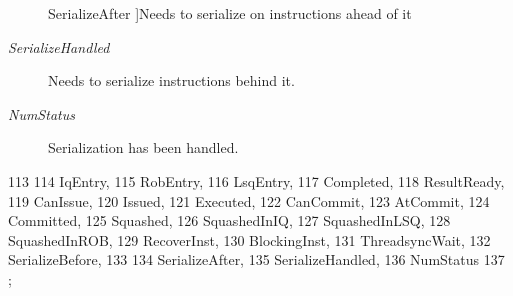 \begin{Desc}
\begin{description}
{{SerializeAfter}
\label{classBaseDynInst_a67a0db04d321a74b7e7fcfd3f1a3f70bab11834485756e0e9b84886d7d014a08f}
}]Needs to serialize on instructions ahead of it \item[{\em 
\hypertarget{classBaseDynInst_a67a0db04d321a74b7e7fcfd3f1a3f70ba5dcfe61e192f9f6a72bc7ff9c5cd8a2b}{
SerializeHandled}
\label{classBaseDynInst_a67a0db04d321a74b7e7fcfd3f1a3f70ba5dcfe61e192f9f6a72bc7ff9c5cd8a2b}
}]Needs to serialize instructions behind it. \item[{\em 
\hypertarget{classBaseDynInst_a67a0db04d321a74b7e7fcfd3f1a3f70bab37ed3bea9670ef9797b74ea37aed2f3}{
NumStatus}
\label{classBaseDynInst_a67a0db04d321a74b7e7fcfd3f1a3f70bab37ed3bea9670ef9797b74ea37aed2f3}
}]Serialization has been handled. \end{description}
\end{Desc}




\begin{DoxyCode}
113                 {
114         IqEntry,                 
115         RobEntry,                
116         LsqEntry,                
117         Completed,               
118         ResultReady,             
119         CanIssue,                
120         Issued,                  
121         Executed,                
122         CanCommit,               
123         AtCommit,                
124         Committed,               
125         Squashed,                
126         SquashedInIQ,            
127         SquashedInLSQ,           
128         SquashedInROB,           
129         RecoverInst,             
130         BlockingInst,            
131         ThreadsyncWait,          
132         SerializeBefore,         
133 
134         SerializeAfter,          
135         SerializeHandled,        
136         NumStatus
137     };
\end{DoxyCode}


